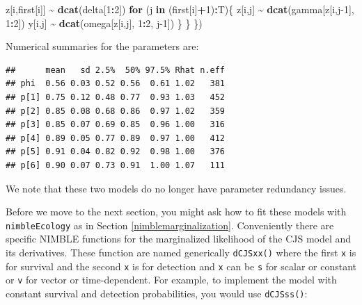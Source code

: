 \documentclass[
  12pt,
]{krantz}
\newenvironment{Shaded}{\begin{snugshade}}{\end{snugshade}}
\newcommand{\ControlFlowTok}[1]{\textcolor[rgb]{0.13,0.29,0.53}{\textbf{#1}}}
\newcommand{\DecValTok}[1]{\textcolor[rgb]{0.00,0.00,0.81}{#1}}
\newcommand{\FunctionTok}[1]{\textcolor[rgb]{0.13,0.29,0.53}{\textbf{#1}}}
\newcommand{\NormalTok}[1]{#1}
\newcommand{\SpecialCharTok}[1]{\textcolor[rgb]{0.81,0.36,0.00}{\textbf{#1}}}
\begin{document}
\begin{Shaded}
\begin{Highlighting}[]
\NormalTok{    z[i,first[i]] }\SpecialCharTok{\textasciitilde{}} \FunctionTok{dcat}\NormalTok{(delta[}\DecValTok{1}\SpecialCharTok{:}\DecValTok{2}\NormalTok{])}
    \ControlFlowTok{for}\NormalTok{ (j }\ControlFlowTok{in}\NormalTok{ (first[i]}\SpecialCharTok{+}\DecValTok{1}\NormalTok{)}\SpecialCharTok{:}\NormalTok{T)\{}
\NormalTok{      z[i,j] }\SpecialCharTok{\textasciitilde{}} \FunctionTok{dcat}\NormalTok{(gamma[z[i,j}\DecValTok{{-}1}\NormalTok{], }\DecValTok{1}\SpecialCharTok{:}\DecValTok{2}\NormalTok{])}
\NormalTok{      y[i,j] }\SpecialCharTok{\textasciitilde{}} \FunctionTok{dcat}\NormalTok{(omega[z[i,j], }\DecValTok{1}\SpecialCharTok{:}\DecValTok{2}\NormalTok{, j}\DecValTok{{-}1}\NormalTok{])}
\NormalTok{    \}}
\NormalTok{  \}}
\NormalTok{\})}
\end{Highlighting}
\end{Shaded}

Numerical summaries for the parameters are:

\begin{verbatim}
##      mean   sd 2.5%  50% 97.5% Rhat n.eff
## phi  0.56 0.03 0.52 0.56  0.61 1.02   381
## p[1] 0.75 0.12 0.48 0.77  0.93 1.03   452
## p[2] 0.85 0.08 0.68 0.86  0.97 1.02   359
## p[3] 0.85 0.07 0.69 0.85  0.96 1.00   316
## p[4] 0.89 0.05 0.77 0.89  0.97 1.00   412
## p[5] 0.91 0.04 0.82 0.92  0.98 1.00   376
## p[6] 0.90 0.07 0.73 0.91  1.00 1.07   111
\end{verbatim}

We note that these two models do no longer have parameter redundancy issues.

Before we move to the next section, you might ask how to fit these models with \texttt{nimbleEcology} as in Section \ref{nimblemarginalization}. Conveniently there are specific NIMBLE functions for the marginalized likelihood of the CJS model and its derivatives. These function are named generically \texttt{dCJSxx()} where the first \texttt{x} is for survival and the second \texttt{x} is for detection and \texttt{x} can be \texttt{s} for scalar or constant or \texttt{v} for vector or time-dependent. For example, to implement the model with constant survival and detection probabilities, you would use \texttt{dCJSss()}:
\end{document}
